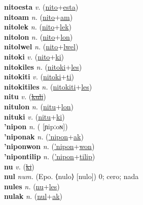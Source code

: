 \textbf{nitoesta} \textit{v.} (\hyperref[nito]{nito}+\hyperref[esta]{esta})
 \label{nitoesta} \\
\textbf{nitoam} \textit{n.} (\hyperref[nito]{nito}+\hyperref[am]{am})
 \label{nitoam} \\
\textbf{nitolek} \textit{n.} (\hyperref[nito]{nito}+\hyperref[lek]{lek})
 \label{nitolek} \\
\textbf{nitolon} \textit{n.} (\hyperref[nito]{nito}+\hyperref[lon]{lon})
 \label{nitolon} \\
\textbf{nitolwel} \textit{n.} (\hyperref[nito]{nito}+\hyperref[lwel]{lwel})
 \label{nitolwel} \\
\textbf{nitoki} \textit{v.} (\hyperref[nito]{nito}+\hyperref[ki]{ki})
 \label{nitoki} \\
\textbf{nitokiles} \textit{n.} (\hyperref[nitoki]{nitoki}+\hyperref[les]{les})
 \label{nitokiles} \\
\textbf{nitokiti} \textit{v.} (\hyperref[nitoki]{nitoki}+\hyperref[ti]{ti})
 \label{nitokiti} \\
\textbf{nitokitiles} \textit{n.} (\hyperref[nitokiti]{nitokiti}+\hyperref[les]{les})
 \label{nitokitiles} \\
\textbf{nitu} \textit{v.} (\hyperref[kuli]{\sout{kuli}})
 \label{nitu} \\
\textbf{nitulon} \textit{n.} (\hyperref[nitu]{nitu}+\hyperref[lon]{lon})
 \label{nitulon} \\
\textbf{nituki} \textit{v.} (\hyperref[nitu]{nitu}+\hyperref[ki]{ki})
 \label{nituki} \\
\textbf{'nipon} \textit{n.} ( [ɲipːoɴ])
 \label{'nipon} \\
\textbf{'niponak} \textit{n.} (\hyperref['nipon]{'nipon}+\hyperref[ak]{ak})
 \label{'niponak} \\
\textbf{'niponwon} \textit{n.} (\hyperref['nipon]{'nipon}+\hyperref[won]{won})
 \label{'niponwon} \\
\textbf{'nipontilip} \textit{n.} (\hyperref['nipon]{'nipon}+\hyperref[tilip]{tilip})
 \label{'nipontilip} \\
\textbf{nu} \textit{v.} (\hyperref[ki]{\sout{ki}})
 \label{nu} \\
\textbf{nul} \textit{num.} (Epo. ⟨nulo⟩ [nulo])
0; cero; nada \label{nul} \\
\textbf{nules} \textit{n.} (\hyperref[nu]{nu}+\hyperref[les]{les})
 \label{nules} \\
\textbf{nulak} \textit{n.} (\hyperref[nul]{nul}+\hyperref[ak]{ak})
 \label{nulak} \\
